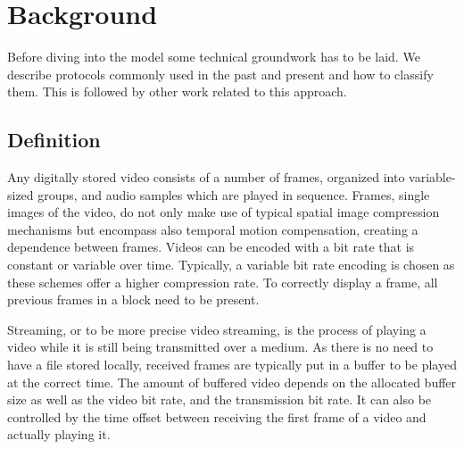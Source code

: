 \section{Background}
\label{c3:background}


Before diving into the model some technical groundwork has to be laid. We describe protocols commonly used in the past and present and how to classify them. This is followed by other work related to this approach.

\subsection{Definition} 

Any digitally stored video consists of a number of frames, organized into variable-sized groups, and audio samples which are played in sequence. Frames, single images of the video, do not only make use of typical spatial image compression mechanisms but encompass also temporal motion compensation, creating a dependence between frames. Videos can be encoded with a bit rate that is constant or variable over time. Typically, a variable bit rate encoding is chosen as these schemes offer a higher compression rate. To correctly display a frame, all previous frames in a block need to be present. 

Streaming, or to be more precise video streaming, is the process of playing a video while it is still being transmitted over a medium. As there is no need to have a file stored locally, received frames are typically put in a buffer to be played at the correct time. The amount of buffered video depends on the allocated buffer size as well as the video bit rate, and the transmission bit rate. It can also be controlled by the time offset between receiving the first frame of a video and actually playing it.


